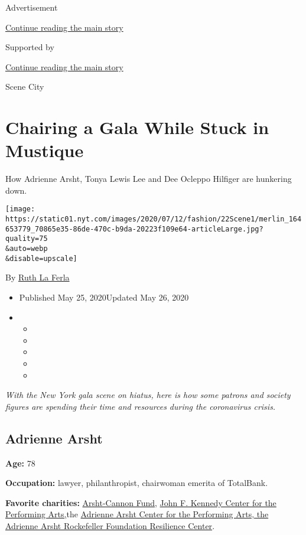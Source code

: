 Advertisement

\protect\hyperlink{after-top}{Continue reading the main story}

Supported by

\protect\hyperlink{after-sponsor}{Continue reading the main story}

Scene City

\hypertarget{chairing-a-gala-while-stuck-in-mustique}{%
\section{Chairing a Gala While Stuck in
Mustique}\label{chairing-a-gala-while-stuck-in-mustique}}

How Adrienne Arsht, Tonya Lewis Lee and Dee Ocleppo Hilfiger are
hunkering down.

\texttt{[image: https://static01.nyt.com/images/2020/07/12/fashion/22Scene1/merlin\_164653779\_70865e35-86de-470c-b9da-20223f109e64-articleLarge.jpg?quality=75\\\&auto=webp\\\&disable=upscale]}

By \href{https://www.nytimes.com/by/ruth-la-ferla}{Ruth La Ferla}

\begin{itemize}
\item
  Published May 25, 2020Updated May 26, 2020
\item
  \begin{itemize}
  \item
  \item
  \item
  \item
  \item
  \end{itemize}
\end{itemize}

\emph{With the New York gala scene on hiatus, here is how some patrons
and society figures are spending their time and resources during the
coronavirus crisis.}

\hypertarget{adrienne-arsht}{%
\subsection{Adrienne Arsht}\label{adrienne-arsht}}

\textbf{Age:} 78

\textbf{Occupation:} lawyer, philanthropist, chairwoman emerita of
TotalBank.

\textbf{Favorite charities:}
\href{https://arshtcannonfund.org}{Arsht-Cannon Fund},
\href{https://www.kennedy-center.org/account/login/}{John F. Kennedy
Center for the Performing Arts,}the
\href{https://www.onebillionresilient.org}{Adrienne Arsht Center for the
Performing Arts, the Adrienne Arsht Rockefeller Foundation Resilience
Center}.

